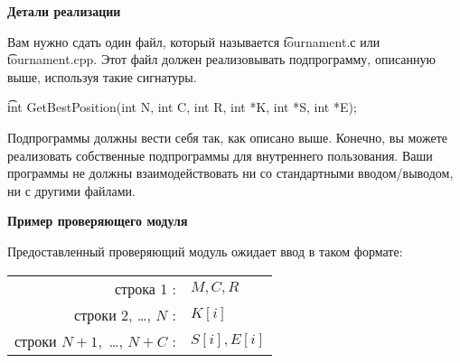 \bf{Детали реализации}

Вам нужно сдать один файл, который называется \t{tournament.с} или \t{tournament.cpp}. Этот файл должен реализовывать подпрограмму, описанную выше, используя такие сигнатуры.

\t{int GetBestPosition(int N, int C, int R, int *K, int *S, int *E);}

Подпрограммы должны вести себя так, как описано выше. Конечно, вы можете реализовать собственные подпрограммы для внутреннего пользования. Ваши программы не должны взаимодействовать ни со стандартными вводом/выводом, ни с другими файлами.

\bf{Пример проверяющего модуля}

Предоставленный проверяющий модуль ожидает ввод в таком формате:

\begin{tabular}{rl}
строка 1 :& $M, C, R$\\
строки 2, \dots, $N$ :& $K[i]$\\
строки $N + 1,$ \dots, $N + C$ :& $S[i], E[i]$\\
\end{tabular}
